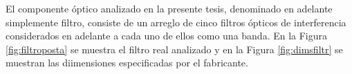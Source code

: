 \hspace{0.5cm}El componente óptico analizado en la presente tesis, denominado en adelante simplemente filtro, consiste de un arreglo de cinco filtros ópticos de interferencia  considerados en adelante a cada uno de ellos como una banda. En la Figura \ref{fig:filtroposta} se muestra el filtro real analizado y en la Figura \ref{fig:dimsfiltr} se muestran las diimensiones especificadas por el fabricante.
\begin{figure}[H]
	\begin{floatrow}

\end{floatrow}
\end{figure}
